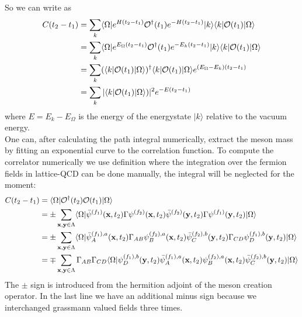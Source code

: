         So we can write  as
        \begin{equation}
            \begin{aligned}
                C(t_2 - t_1) &= \sum_k \langle\Omega|e^{H(t_2 - t_1)}\mathcal{O}^\dagger(t_1)e^{-H(t_2 - t_1)} |k\rangle\langle k| \mathcal{O}(t_1)|\Omega\rangle\\
                &= \sum_k \langle\Omega|e^{E_\Omega(t_2 - t_1)}\mathcal{O}^\dagger(t_1)e^{-E_k(t_2 - t_1)} |k\rangle\langle k| \mathcal{O}(t_1)|\Omega\rangle\\
                &= \sum_k (\langle k|\mathcal{O}(t_1) |\Omega\rangle)^\dagger\langle k| \mathcal{O}(t_1)|\Omega\rangle e^{(E_\Omega - E_k)(t_2 - t_1)}\\
                &= \sum_k |\langle k|\mathcal{O}(t_1) |\Omega\rangle)|^2 e^{-E(t_2 - t_1)}\\
            \end{aligned}
        \end{equation}
        where $E = E_k - E_\Omega$ is the energy of the energystate $|k\rangle$ relative to the vacuum energy.\\
        
        One can, after calculating the path integral numerically, extract the meson mass by fitting an exponential curve to the correlation function.
        To compute the correlator numerically we use definition  where the integration over the fermion fields in lattice-QCD can be done manually, the integral will be neglected for the moment:
        \begin{equation}\label{correlation_in_t}
            \begin{aligned}
                C(t_2 - t_1) &= \langle\Omega|\mathcal{O}^\dagger(t_2)\mathcal{O}(t_1)|\Omega\rangle\\
                &= \pm \sum_{\textbf{x},\textbf{y}\in\Lambda}
                \langle\Omega|\bar{\psi}^{(f_1)}(\textbf{x},t_2)\Gamma\psi^{(f_2)}(\textbf{x},t_2)
                \bar{\psi}^{(f_2)}(\textbf{y},t_2)\Gamma\psi^{(f_1)}(\textbf{y},t_2)|\Omega\rangle\\
                &= \pm \sum_{\textbf{x},\textbf{y}\in\Lambda}
                \langle\Omega|\bar{\psi}_A^{(f_1),a}(\textbf{x},t_2)\Gamma_{AB}\psi_B^{(f_2),a}(\textbf{x},t_2)
                \bar{\psi}^{(f_2),b}_C(\textbf{y},t_2)\Gamma_{CD}\psi_D^{(f_1),b}(\textbf{y},t_2)|\Omega\rangle\\
                &= \mp \sum_{\textbf{x},\textbf{y}\in\Lambda}\Gamma_{AB}\Gamma_{CD}
                \langle\Omega|\psi_D^{(f_1),b}(\textbf{y},t_2)\bar{\psi}_A^{(f_1),a}(\textbf{x},t_2)
                \psi_B^{(f_2),a}(\textbf{x},t_2)\bar{\psi}^{(f_2),b}_C(\textbf{y},t_2)|\Omega\rangle
            \end{aligned}
        \end{equation}
        The $\pm$ sign is introduced from the hermition adjoint  of the meson creation operator. In the last line we have an additional minus sign because we interchanged grassmann valued fields three times.\\
        
